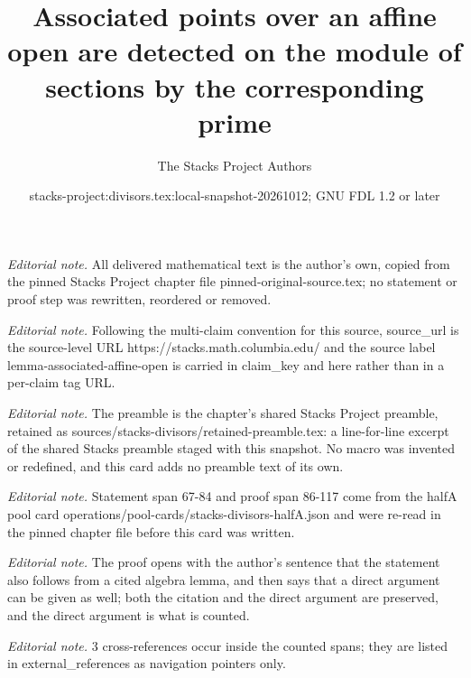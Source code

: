 \documentclass[10pt,a4paper]{amsart}
\title{Associated points over an affine open are detected on the module of sections by the corresponding prime}
\author{The Stacks Project Authors}
\date{stacks-project:divisors.tex:local-snapshot-20261012; GNU FDL 1.2 or later}
\theoremstyle{plain}
\theoremstyle{definition}
\theoremstyle{remark}
\numberwithin{equation}{subsection}
\begin{document}
\maketitle
\noindent\textit{Editorial note.} All delivered mathematical text is the author's own, copied from the pinned Stacks Project chapter file pinned-original-source.tex; no statement or proof step was rewritten, reordered or removed.\par\medskip
\noindent\textit{Editorial note.} Following the multi-claim convention for this source, source\_url is the source-level URL https://stacks.math.columbia.edu/ and the source label lemma-associated-affine-open is carried in claim\_key and here rather than in a per-claim tag URL.\par\medskip
\noindent\textit{Editorial note.} The preamble is the chapter's shared Stacks Project preamble, retained as sources/stacks-divisors/retained-preamble.tex: a line-for-line excerpt of the shared Stacks preamble staged with this snapshot. No macro was invented or redefined, and this card adds no preamble text of its own.\par\medskip
\noindent\textit{Editorial note.} Statement span 67-84 and proof span 86-117 come from the halfA pool card operations/pool-cards/stacks-divisors-halfA.json and were re-read in the pinned chapter file before this card was written.\par\medskip
\noindent\textit{Editorial note.} The proof opens with the author's sentence that the statement also follows from a cited algebra lemma, and then says that a direct argument can be given as well; both the citation and the direct argument are preserved, and the direct argument is what is counted.\par\medskip
\noindent\textit{Editorial note.} 3 cross-references occur inside the counted spans; they are listed in external\_references as navigation pointers only.\par\medskip
\end{document}
